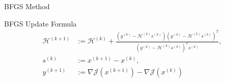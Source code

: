 \begin{frame}{BFGS Method}
    \begin{block}{BFGS Update Formula}
        \vspace*{-13pt}
        \begin{align*}
            \mathcal{H}^{(k + 1)} &:= \mathcal{H}^{(k)} + \frac{(y^{(k)} - \mathcal{H}^{(k)} s^{(k)}){(y^{(k)} - \mathcal{H}^{(k)} s^{(k)})}^T}{{(y^{(k)} - \mathcal{H}^{(k)} s^{(k)})}^T s^{(k)}}, \\
            s^{(k)} &:= x^{(k + 1)} - x^{(k)}, \\
            y^{(k + 1)} &:= \nabla \mathcal{J}(x^{(k + 1)}) - \nabla \mathcal{J}(x^{(k)})
        \end{align*}
    \end{block}
\end{frame}